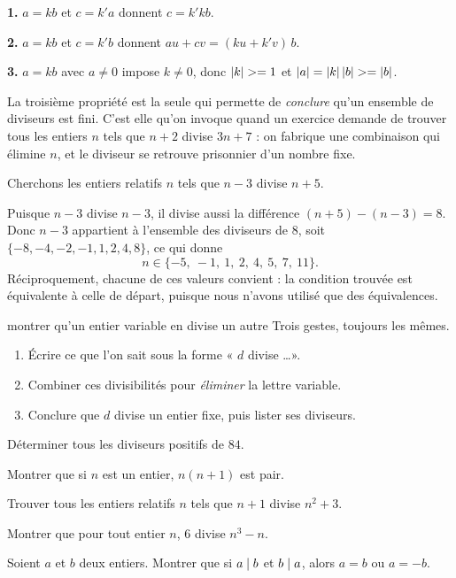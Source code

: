 \begin{demonstration}
\textbf{1.} $a = kb$ et $c = k'a$ donnent $c = k'kb$.

\textbf{2.} $a = kb$ et $c = k'b$ donnent $au+cv = (ku+k'v)\,b$.

\textbf{3.} $a = kb$ avec $a \neq 0$ impose $k \neq 0$, donc
$\left|k\right| >= 1$ et $\left|a\right| = \left|k\right|\left|b\right| >= \left|b\right|$.
\end{demonstration}

\begin{avertissement}
La troisième propriété est la seule qui permette de \emph{conclure} qu'un
ensemble de diviseurs est fini. C'est elle qu'on invoque quand un exercice
demande de trouver tous les entiers $n$ tels que $n+2$ divise $3n+7$ : on
fabrique une combinaison qui élimine $n$, et le diviseur se retrouve
prisonnier d'un nombre fixe.
\end{avertissement}

\begin{exemple}
Cherchons les entiers relatifs $n$ tels que $n-3$ divise $n+5$.

Puisque $n-3$ divise $n-3$, il divise aussi la différence
$(n+5)-(n-3) = 8$. Donc $n-3$ appartient à l'ensemble des diviseurs de $8$,
soit $\{-8,-4,-2,-1,1,2,4,8\}$, ce qui donne
\[
  n \in \{-5,\ -1,\ 1,\ 2,\ 4,\ 5,\ 7,\ 11\}.
\]
Réciproquement, chacune de ces valeurs convient : la condition trouvée est
équivalente à celle de départ, puisque nous n'avons utilisé que des
équivalences.
\end{exemple}

\begin{methode}{montrer qu'un entier variable en divise un autre}
Trois gestes, toujours les mêmes.
\begin{enumerate}[label=\textbf{\arabic*.}, leftmargin=*, itemsep=0.15em]
  \item Écrire ce que l'on sait sous la forme « $d$ divise \dots ».
  \item Combiner ces divisibilités pour \emph{éliminer} la lettre variable.
  \item Conclure que $d$ divise un entier fixe, puis lister ses diviseurs.
\end{enumerate}
\end{methode}

\begin{entrainement}[divisibilité]
\exo[\niveau{1}] Déterminer tous les diviseurs positifs de $84$.

\exo[\niveau{1}] Montrer que si $n$ est un entier, $n(n+1)$ est pair.

\exo[\niveau{2}] Trouver tous les entiers relatifs $n$ tels que $n+1$ divise
$n^{2}+3$.

\exo[\niveau{2}] Montrer que pour tout entier $n$, $6$ divise
$n^{3}-n$.

\exo[\niveau{3}] Soient $a$ et $b$ deux entiers. Montrer que si $a \mid b$ et
$b \mid a$, alors $a = b$ ou $a = -b$.
\end{entrainement}

